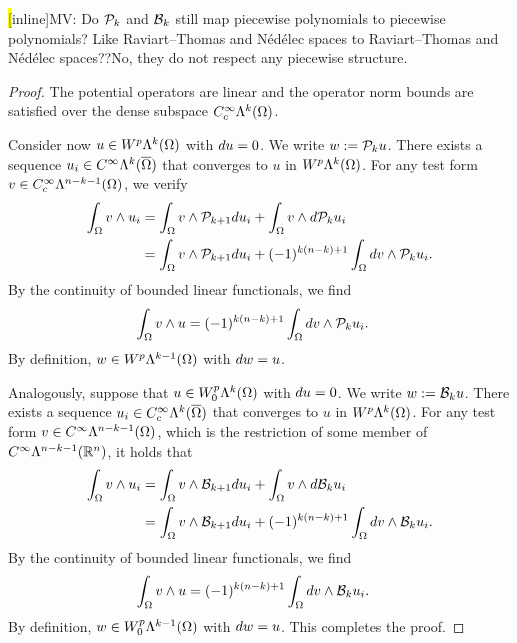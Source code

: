 \documentclass[10pt,letterpaper]{article}
\newcommand{\todo}[1]{{\colorbox{yellow}{#1}}}
\newcommand{\mwl}[1]{{\color{red}#1}}
\begin{document}
\todo[inline]{MV: Do ${\mathcal P}_{k}$ and ${\mathcal B}_{k}$ still map piecewise polynomials to piecewise polynomials? Like Raviart--Thomas and N\'ed\'elec spaces to Raviart--Thomas and N\'ed\'elec spaces??}\mwl{No, they do not respect any piecewise structure.}

\begin{proof}
    The potential operators are linear and the operator norm bounds are satisfied over the dense subspace $C^{\infty}_{c}\Lambda^{k}(\Omega)$.
    
    Consider now $u \in W^{p}\Lambda^{k}(\Omega)$ with $d u = 0$. 
    We write $w := {\mathcal P}_{k  } u$. 
    There exists a sequence $u_{i} \in C^{\infty}\Lambda^{k}(\overline\Omega)$ that converges to $u$ in $W^{p}\Lambda^{k}(\Omega)$. 
    For any test form $v \in C^{\infty}_{c}\Lambda^{n-k-1}(\Omega)$, we verify 
    \begin{align*}
        \int_{\Omega} v \wedge u_{i} 
        &=
        \int_{\Omega} v \wedge {\mathcal P}_{k+1} d u_{i}
        +
        \int_{\Omega} v \wedge d {\mathcal P}_{k  } u_{i}
        \\&=
        \int_{\Omega} v \wedge {\mathcal P}_{k+1} d u_{i}
        +
        (-1)^{k(n-k)+1}
        \int_{\Omega} d v \wedge {\mathcal P}_{k  } u_{i}
        .
    \end{align*}
    By the continuity of bounded linear functionals, we find 
    \begin{align*}
        \int_{\Omega} v \wedge u 
        &=
        (-1)^{k(n-k)+1}
        \int_{\Omega} d v \wedge {\mathcal P}_{k  } u_{i}
        .
    \end{align*}
    By definition, $w \in W^{p}\Lambda^{k-1}(\Omega)$ with $d w = u$.
    
    
    Analogously, suppose that $u \in W^{p}_{0}\Lambda^{k}(\Omega)$ with $d u = 0$. 
    We write $w := {\mathcal B}_{k} u$. 
    There exists a sequence $u_{i} \in C^{\infty}_{c}\Lambda^{k}(\overline\Omega)$ that converges to $u$ in $W^{p}\Lambda^{k}(\Omega)$. 
    For any test form $v \in C^{\infty}\Lambda^{n-k-1}(\Omega)$, 
    which is the restriction of some member of $C^{\infty}\Lambda^{n-k-1}({\mathbb R}^{n})$, 
    it holds that 
    \begin{align*}
        \int_{\Omega} v \wedge u_{i} 
        &=
        \int_{\Omega} v \wedge {\mathcal B}_{k+1} d u_{i}
        +
        \int_{\Omega} v \wedge d {\mathcal B}_{k  } u_{i}
        \\&=
        \int_{\Omega} v \wedge {\mathcal B}_{k+1} d u_{i}
        +
        (-1)^{k(n-k)+1}
        \int_{\Omega} d v \wedge {\mathcal B}_{k  } u_{i}
        .
    \end{align*}
    By the continuity of bounded linear functionals, we find 
    \begin{align*}
        \int_{\Omega} v \wedge u 
        &=
        (-1)^{k(n-k)+1}
        \int_{\Omega} d v \wedge {\mathcal B}_{k  } u_{i}
        .
    \end{align*}
    By definition, $w \in W^{p}_{0}\Lambda^{k-1}(\Omega)$ with $d w = u$.
    This completes the proof. 
\end{proof}
\end{document}
